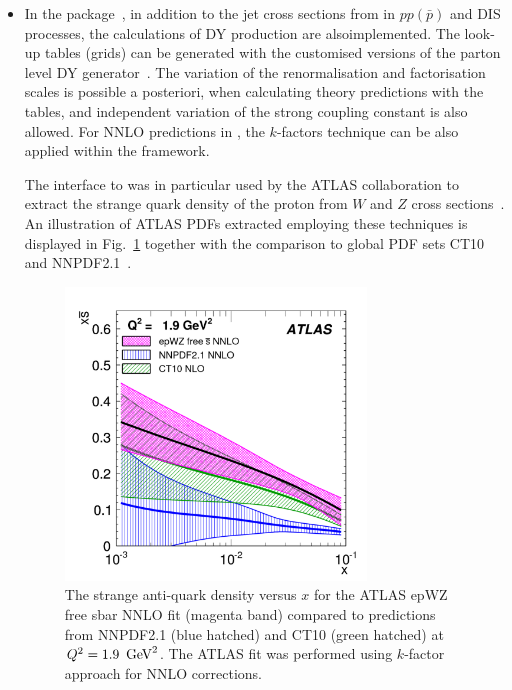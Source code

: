 \begin{itemize}
\item In the \applgrid package~\cite{Carli:2010rw,APPLGRID:HepForge},
    in addition to the jet cross sections from \nlojetpp 
    in $pp(\bar p)$ and DIS processes, the calculations 
    of DY production are alsoimplemented. The look-up tables (grids) can be generated with
    the customised versions of the \mcfm parton level DY
    generator~\cite{Campbell:1999ah,Campbell:2000je,Campbell:2010ff}.  
    The variation of the renormalisation and factorisation scales is possible a posteriori,
    when calculating theory predictions with the \applgrid  tables, and
    independent variation of the strong coupling constant is also allowed.
    For NNLO predictions in \fitter, the $k$-factors technique can be also applied
    within the \applgrid framework.

    The \fitter interface to \applgrid was in particular used by the ATLAS
    collaboration to extract the strange quark density of the proton
    from $W$ and $Z$ cross sections~\cite{atlas:strange}. An
    illustration of ATLAS PDFs extracted employing these techniques
    is displayed in
    Fig.~\ref{fig:atlas} together with the comparison to global PDF
    sets CT10~\cite{CT10pdf} and NNPDF2.1~\cite{NNPDFpdf}.

\begin{figure}[!ht]
  \centering
  \includegraphics[width=8cm]{atlas.pdf}
  \caption{The strange anti-quark density versus $x$ for the ATLAS
    epWZ free sbar NNLO fit \cite{atlas:strange} (magenta band) compared to predictions
    from NNPDF2.1 (blue hatched) and CT10 (green hatched) 
    at $Q^2 = 1.9\ \,\text{Ge\hspace{-.08em}V}^2$. The ATLAS fit was performed using $k$-factor approach 
    for NNLO corrections.}
  \label{fig:atlas}
\end{figure}


\end{itemize}
